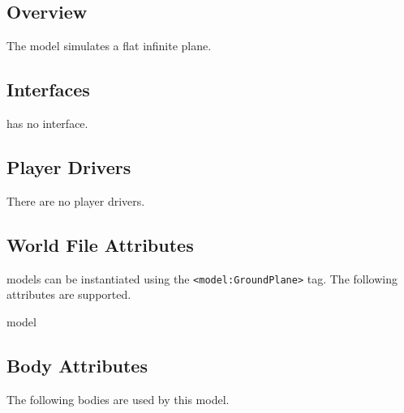 \subsection{Overview}

The {\tt \modelName} model simulates a flat infinite plane.

\subsection{\libgazebo Interfaces}

{\tt \modelName} has no \libgazebo interface.

\subsection{Player Drivers}

There are no player drivers.

\subsection{World File Attributes}

{\tt \modelName} models can be instantiated using the
\verb+<model:GroundPlane>+ tag.  The following attributes are
supported.

\begin{xmlattrtable}{model}{\modelName}
\modeldefaults
{}
\end{xmlattrtable}


\subsection{Body Attributes}

The following bodies are used by this model.

\begin{bodyattrtable}
\bodydefaults
\end{bodyattrtable}

